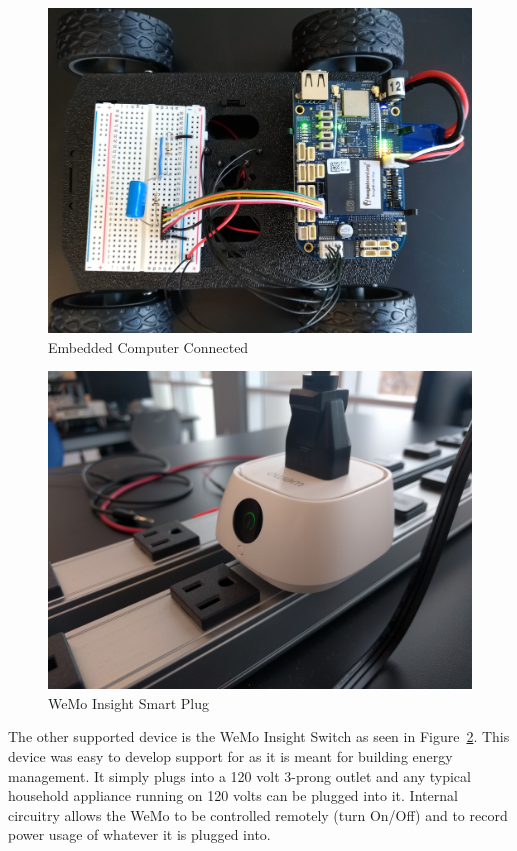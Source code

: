 \begin{figure}[H]
    \centering
    \includegraphics[scale=0.1]{figs/beaglebone/connectedSBC.jpg}
    \caption{Embedded Computer Connected}
    \label{fig:connected_bb}
\end{figure}

\begin{figure}[H]
    \centering
    \includegraphics[scale=0.085]{figs/wemo/wemoView.jpg}
    \caption{WeMo Insight Smart Plug}
    \label{fig:wemo}
\end{figure}

The other supported device is the WeMo Insight Switch as seen in Figure~\ref{fig:wemo}. This device was easy to develop support for as it is meant for building energy management. It simply plugs into a 120 volt 3-prong outlet and any typical household appliance running on 120 volts can be plugged into it. Internal circuitry allows the WeMo to be controlled remotely (turn On/Off) and to record power usage of whatever it is plugged into.

